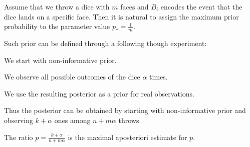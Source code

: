 \documentclass[landscape,footrule]{foils}
\begin{document}
Assume that we throw a dice with $m$ faces and $B_i$ encodes the event that the dice lands on a specific face. Then it is natural to assign the maximum prior probability to the parameter value $p_*=\frac{1}{m}$.
\vspace*{1cm}

Such prior can be defined through a following though experiment:
\begin{triangles}
\item We start with non-informative prior.
\item We observe all possible outcomes of the dice $\alpha$ times.
\item We use the resulting posterior as a prior for real observations. 
\end{triangles}
\vspace*{1cm}

Thus the posterior can be obtained by starting with non-informative prior and observing $k+\alpha$ ones among $n + m\alpha$ throws.  
\begin{triangles}
\item The ratio $p=\frac{k+\alpha}{n+m\alpha}$ is the maximal aposteriori estimate for $p$.
\end{triangles}
\end{document}
